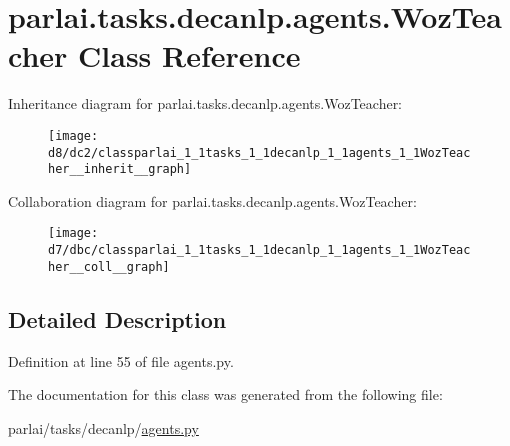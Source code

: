 \hypertarget{classparlai_1_1tasks_1_1decanlp_1_1agents_1_1WozTeacher}{}\section{parlai.\+tasks.\+decanlp.\+agents.\+Woz\+Teacher Class Reference}
\label{classparlai_1_1tasks_1_1decanlp_1_1agents_1_1WozTeacher}


Inheritance diagram for parlai.\+tasks.\+decanlp.\+agents.\+Woz\+Teacher\+:
\nopagebreak
\begin{figure}[H]
\begin{center}
\leavevmode
\texttt{[image: d8/dc2/classparlai\_1\_1tasks\_1\_1decanlp\_1\_1agents\_1\_1WozTeacher\_\_inherit\_\_graph]}
\end{center}
\end{figure}


Collaboration diagram for parlai.\+tasks.\+decanlp.\+agents.\+Woz\+Teacher\+:
\nopagebreak
\begin{figure}[H]
\begin{center}
\leavevmode
\texttt{[image: d7/dbc/classparlai\_1\_1tasks\_1\_1decanlp\_1\_1agents\_1\_1WozTeacher\_\_coll\_\_graph]}
\end{center}
\end{figure}


\subsection{Detailed Description}


Definition at line 55 of file agents.\+py.



The documentation for this class was generated from the following file\+:\begin{DoxyCompactItemize}
\item 
parlai/tasks/decanlp/\hyperlink{parlai_2tasks_2decanlp_2agents_8py}{agents.\+py}\end{DoxyCompactItemize}
